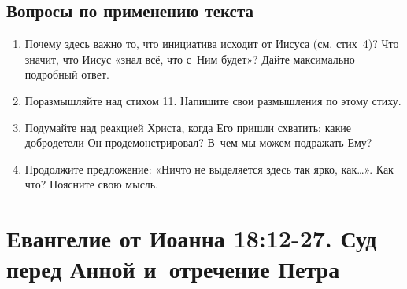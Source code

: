 \documentclass[a4paper,12pt]{article}
\begin{document}
\subsection*{Вопросы по применению текста} 
\begin{enumerate}
    \item Почему здесь важно то, что инициатива исходит от Иисуса (см. стих~4)? Что значит, что Иисус «знал всё, что с~Ним будет»? Дайте максимально подробный ответ. 
    
    \myline
    
    \myline
    \item Поразмышляйте над стихом 11. Напишите свои размышления по этому стиху. 
    
    \myline
    
    \myline
    \item Подумайте над реакцией Христа, когда Его пришли схватить: какие добродетели Он продемонстрировал? В~чем мы можем подражать Ему? 
    
    \myline
    
    \myline
    \item Продолжите предложение: «Ничто не выделяется здесь так ярко, как…». Как что? Поясните свою мысль.
    
    \myline
    
    \myline
\end{enumerate}



\section{Евангелие от Иоанна 18:12-27. Суд перед Анной и~отречение Петра}
\end{document}
